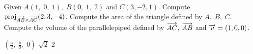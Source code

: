 
\begin{Exercise}[
name={},
title={}, 
difficulty=0,
origin={\cite{YL}}]
Given $A(1,\; 0,\; 1),\; B(0,\; 1,\; 2)$ and $C(3, -2, 1)$.
\Question Compute $\text{proj}_{\overrightarrow{AB}\times\overrightarrow{AC}} (2,3,-4)$.
\Question Compute the area of the triangle defined by $A,\; B,\; C$.
\Question Compute the volume of the parallelepiped defined by $\overrightarrow{AC}$, $\overrightarrow{AB}$ and $\overrightarrow{v}=(1,0,0)$.
\end{Exercise}

\begin{Answer}
\Question $\left(\frac{5}{2},\;\frac{5}{2},\;0\right)$
\Question $\sqrt{2}$
\Question $2$
\end{Answer}
